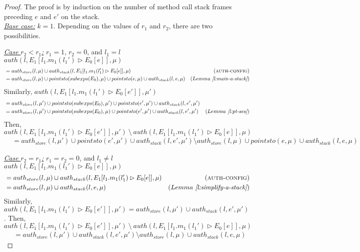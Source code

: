 \documentclass{llncs}
\begin{document}
\begin{proof} The proof is by induction on the number of method call stack frames preceding $e$ and $e'$ on the stack.\\

\noindent\underline{\underline{\textit{Base case:}}} $k = 1$. Depending on the values of $r_1$ and $r_2$, there are two possibilities.

\noindent\underline{\textit{Case $r_2 < r_1$:}} $r_1 = 1$, $r_2 = 0$, and $l_1 = l$\\
\noindent$auth(l, E_1[l_1.m_1(l_1') \rhd E_0[e]], \mu)$
\vspace{-7pt}
\begin{align*}
&= auth_{store}(l, \mu) \cup auth_{stack}(l, E_1[l_1.m_1(l_1') \rhd E_0[e]], \mu) & (\textsc{auth-config})\\
&= auth_{store}(l, \mu) \cup pointsto(subexps(E_0), \mu) \cup pointsto(e, \mu) \cup auth_{stack}(l, e, \mu) & (Lemma~\textit{\ref{l:main-a-stack}})
\end{align*}
Similarly,
\noindent$auth(l, E_1[l_1.m_1(l_1') \rhd E_0[e']], \mu')$
\vspace{-7pt}
\begin{align*}
&= auth_{store}(l, \mu') \cup pointsto(subexps(E_0), \mu') \cup pointsto(e', \mu') \cup auth_{stack}(l, e', \mu')\\
&= auth_{store}(l, \mu') \cup pointsto(subexps(E_0), \mu) \cup pointsto(e', \mu') \cup auth_{stack}(l, e', \mu') & (Lemma~\textit{\ref{l:pt-ses}})
\end{align*}
Then, 
\noindent$auth(l, E_1[l_1.m_1(l_1') \rhd E_0[e']], \mu')~\setminus~auth(l, E_1[l_1.m_1(l_1') \rhd E_0[e]], \mu)$
\vspace{-7pt}
\begin{align*}
&= auth_{store}(l, \mu') \cup pointsto(e', \mu') \cup auth_{stack}(l, e', \mu') \setminus auth_{store}(l, \mu) \cup pointsto(e, \mu) \cup auth_{stack}(l, e, \mu)
\end{align*}


\noindent\underline{\textit{Case $r_2 = r_1$:}} $r_1 = r_2 = 0$, and $l_1 \neq l$\\
\noindent$auth(l, E_1[l_1.m_1(l_1') \rhd E_0[e]], \mu)$
\vspace{-7pt}
\begin{align*}
&= auth_{store}(l, \mu) \cup auth_{stack}(l, E_1[l_1.m_1(l_1') \rhd E_0[e]], \mu) & (\textsc{auth-config})\\
&= auth_{store}(l, \mu) \cup auth_{stack}(l, e, \mu) & (Lemma~\textit{\ref{l:simplify-a-stack}})
\end{align*}
Similarly,
\noindent$auth(l, E_1[l_1.m_1(l_1') \rhd E_0[e']], \mu') = auth_{store}(l, \mu') \cup auth_{stack}(l, e', \mu')$. Then,\\
\noindent$auth(l, E_1[l_1.m_1(l_1') \rhd E_0[e']], \mu')~\setminus~auth(l, E_1[l_1.m_1(l_1') \rhd E_0[e]], \mu)$
\vspace{-7pt}
\begin{align*}
&= auth_{store}(l, \mu') \cup auth_{stack}(l, e', \mu') \setminus auth_{store}(l, \mu) \cup auth_{stack}(l, e, \mu)
\end{align*}


\end{proof}
\end{document}
